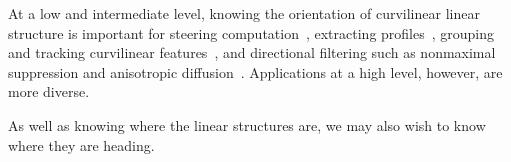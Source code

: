 \label{s:review_orientation}
%
At a low and intermediate level, knowing the orientation of curvilinear linear structure is important for steering computation~\cite{Sonka_99}, extracting profiles~\cite{Zwiggelaar_etal_TMI04,Staal_etal_TMI04}, grouping and tracking curvilinear features~\cite{Aylward_Bullitt_TMI02}, and directional filtering such as nonmaximal suppression and anisotropic diffusion~\cite{Perona_PAMI90}. 
Applications at a high level, however, are more diverse.

As well as knowing where the linear structures are, we may also wish to know where they are heading.